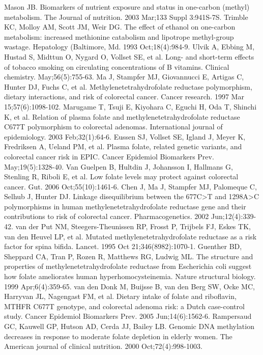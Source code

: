 \begin{thebibliography}{12}
		Mason JB. Biomarkers of nutrient exposure and status in one-carbon (methyl) metabolism. The Journal of nutrition. 2003 Mar;133 Suppl 3:941S-7S. 
		Trimble KC, Molloy AM, Scott JM, Weir DG. The effect of ethanol on one-carbon metabolism: increased methionine catabolism and lipotrope methyl-group wastage. Hepatology (Baltimore, Md. 1993 Oct;18(4):984-9. 
		Ulvik A, Ebbing M, Hustad S, Midttun O, Nygard O, Vollset SE, et al. Long- and short-term effects of tobacco smoking on circulating concentrations of B vitamins. Clinical chemistry.  May;56(5):755-63. 
		Ma J, Stampfer MJ, Giovannucci E, Artigas C, Hunter DJ, Fuchs C, et al. Methylenetetrahydrofolate reductase polymorphism, dietary interactions, and risk of colorectal cancer. Cancer research. 1997 Mar 15;57(6):1098-102. 
		Marugame T, Tsuji E, Kiyohara C, Eguchi H, Oda T, Shinchi K, et al. Relation of plasma folate and methylenetetrahydrofolate reductase C677T polymorphism to colorectal adenomas. International journal of epidemiology. 2003 Feb;32(1):64-6. 
		Eussen SJ, Vollset SE, Igland J, Meyer K, Fredriksen A, Ueland PM, et al. Plasma folate, related genetic variants, and colorectal cancer risk in EPIC. Cancer Epidemiol Biomarkers Prev.  May;19(5):1328-40. 
		Van Guelpen B, Hultdin J, Johansson I, Hallmans G, Stenling R, Riboli E, et al. Low folate levels may protect against colorectal cancer. Gut. 2006 Oct;55(10):1461-6. 
		Chen J, Ma J, Stampfer MJ, Palomeque C, Selhub J, Hunter DJ. Linkage disequilibrium between the 677C>T and 1298A>C polymorphisms in human methylenetetrahydrofolate reductase gene and their contributions to risk of colorectal cancer. Pharmacogenetics. 2002 Jun;12(4):339-42. 
		van der Put NM, Steegers-Theunissen RP, Frosst P, Trijbels FJ, Eskes TK, van den Heuvel LP, et al. Mutated methylenetetrahydrofolate reductase as a risk factor for spina bifida. Lancet. 1995 Oct 21;346(8982):1070-1. 
		Guenther BD, Sheppard CA, Tran P, Rozen R, Matthews RG, Ludwig ML. The structure and properties of methylenetetrahydrofolate reductase from Escherichia coli suggest how folate ameliorates human hyperhomocysteinemia. Nature structural biology. 1999 Apr;6(4):359-65. 
		van den Donk M, Buijsse B, van den Berg SW, Ocke MC, Harryvan JL, Nagengast FM, et al. Dietary intake of folate and riboflavin, MTHFR C677T genotype, and colorectal adenoma risk: a Dutch case-control study. Cancer Epidemiol Biomarkers Prev. 2005 Jun;14(6):1562-6. 
		Rampersaud GC, Kauwell GP, Hutson AD, Cerda JJ, Bailey LB. Genomic DNA methylation decreases in response to moderate folate depletion in elderly women. The American journal of clinical nutrition. 2000 Oct;72(4):998-1003. 

\end{thebibliography}
